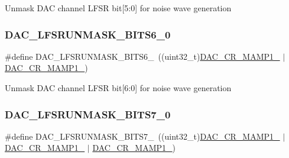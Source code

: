 Unmask D\+AC channel L\+F\+SR bit\mbox{[}5\+:0\mbox{]} for noise wave generation \mbox{\label{group___d_a_c_ex__lfsrunmask__triangleamplitude_ga17ee7ec51f948f30e8ff1779033de0a8}} 
\subsubsection{\texorpdfstring{DAC\_LFSRUNMASK\_BITS6\_0}{DAC\_LFSRUNMASK\_BITS6\_0}}
{\footnotesize\ttfamily \#define D\+A\+C\+\_\+\+L\+F\+S\+R\+U\+N\+M\+A\+S\+K\+\_\+\+B\+I\+T\+S6\+\_~((uint32\+\_\+t)\mbox{\hyperlink{group___peripheral___registers___bits___definition_ga0fefef1d798a2685b03e44bd9fdac06b}{D\+A\+C\+\_\+\+C\+R\+\_\+\+M\+A\+M\+P1\+\_}} $\vert$ \mbox{\hyperlink{group___peripheral___registers___bits___definition_ga6cc15817842cb7992d449c448684f68d}{D\+A\+C\+\_\+\+C\+R\+\_\+\+M\+A\+M\+P1\+\_}})}

Unmask D\+AC channel L\+F\+SR bit\mbox{[}6\+:0\mbox{]} for noise wave generation \mbox{\label{group___d_a_c_ex__lfsrunmask__triangleamplitude_ga5ec6464589b3c0d11fff052fbccc6fde}} 
\subsubsection{\texorpdfstring{DAC\_LFSRUNMASK\_BITS7\_0}{DAC\_LFSRUNMASK\_BITS7\_0}}
{\footnotesize\ttfamily \#define D\+A\+C\+\_\+\+L\+F\+S\+R\+U\+N\+M\+A\+S\+K\+\_\+\+B\+I\+T\+S7\+\_~((uint32\+\_\+t)\mbox{\hyperlink{group___peripheral___registers___bits___definition_ga0fefef1d798a2685b03e44bd9fdac06b}{D\+A\+C\+\_\+\+C\+R\+\_\+\+M\+A\+M\+P1\+\_}} $\vert$ \mbox{\hyperlink{group___peripheral___registers___bits___definition_ga6cc15817842cb7992d449c448684f68d}{D\+A\+C\+\_\+\+C\+R\+\_\+\+M\+A\+M\+P1\+\_}} $\vert$ \mbox{\hyperlink{group___peripheral___registers___bits___definition_ga4225dcce22b440fcd3a8ad96c5f2baec}{D\+A\+C\+\_\+\+C\+R\+\_\+\+M\+A\+M\+P1\+\_}})}

